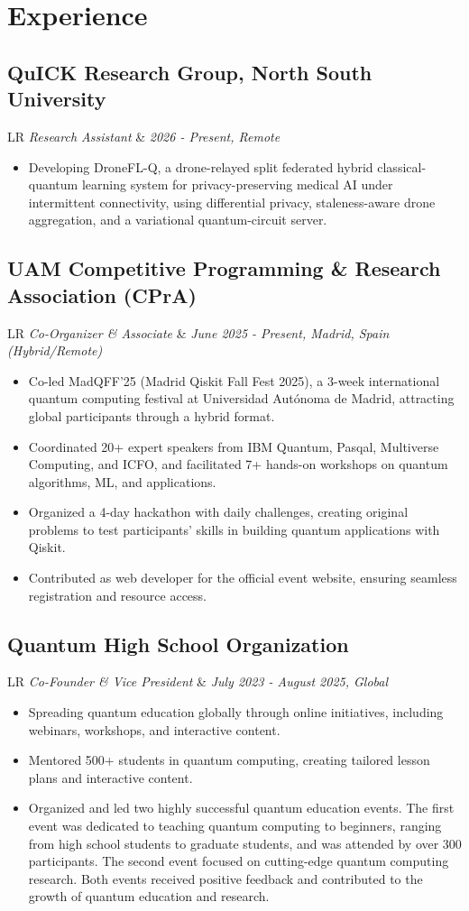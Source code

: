 \documentclass[11pt,a3paper]{moderncv}
\newcommand*{\experienceentry}[5][1.5mm]{
    \subsection{#2} \vspace{-1.5mm}
    \begin{tabularx}{\textwidth}{LR}
        {\itshape #3} & {\itshape #4, #5}
    \end{tabularx}
    \par\addvspace{#1}
}
\begin{document}
\begin{minipage}[t]{0.62\textwidth}
\section{Experience}
{\small
\experienceentry{QuICK Research Group, North South University}{Research Assistant}{2026 - Present}{Remote}
\begin{itemize}
    \item Developing DroneFL-Q, a drone-relayed split federated hybrid classical-quantum learning system for privacy-preserving medical AI under intermittent connectivity, using differential privacy, staleness-aware drone aggregation, and a variational quantum-circuit server.
\end{itemize}
\vspace{1.0mm}

\experienceentry{UAM Competitive Programming \& Research Association (CPrA)}{Co-Organizer \& Associate}{June 2025 - Present}{Madrid, Spain (Hybrid/Remote)}
\begin{itemize}
    \item Co-led MadQFF'25 (Madrid Qiskit Fall Fest 2025), a 3-week international quantum computing festival at Universidad Autónoma de Madrid, attracting global participants through a hybrid format.
    \item Coordinated 20+ expert speakers from IBM Quantum, Pasqal, Multiverse Computing, and ICFO, and facilitated 7+ hands-on workshops on quantum algorithms, ML, and applications.
    \item Organized a 4-day hackathon with daily challenges, creating original problems to test participants' skills in building quantum applications with Qiskit.
    \item Contributed as web developer for the official event website, ensuring seamless registration and resource access.
\end{itemize}
\vspace{1.0mm}

\experienceentry{Quantum High School Organization}{Co-Founder \& Vice President}{July 2023 - August 2025}{Global}
\begin{itemize}
    \item Spreading quantum education globally through online initiatives, including webinars, workshops, and interactive content.
    \item Mentored 500+ students in quantum computing, creating tailored lesson plans and interactive content.
    \item Organized and led two highly successful quantum education events. The first event was dedicated to teaching quantum computing to beginners, ranging from high school students to graduate students, and was attended by over 300 participants. The second event focused on cutting-edge quantum computing research. Both events received positive feedback and contributed to the growth of quantum education and research.
\end{itemize}
\vspace{1.0mm}

}
\end{minipage}
\end{document}
